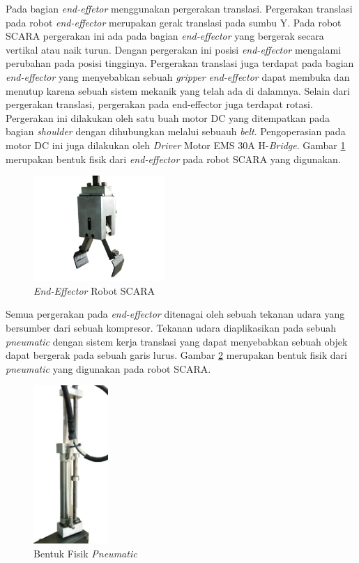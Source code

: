 Pada bagian \textit{end-effetor} menggunakan pergerakan translasi. Pergerakan translasi pada robot \textit{end-effector} merupakan gerak translasi pada sumbu Y. Pada robot SCARA pergerakan ini ada pada bagian \textit{end-effector} yang bergerak secara vertikal atau naik turun. Dengan pergerakan ini posisi \textit{end-effector} mengalami perubahan pada posisi tingginya. Pergerakan translasi juga terdapat pada bagian \textit{end-effector} yang menyebabkan sebuah \textit{gripper }\textit{ end-effector} dapat membuka dan menutup karena sebuah sistem mekanik yang telah ada di dalamnya. Selain dari pergerakan translasi, pergerakan pada end-effector juga terdapat rotasi. Pergerakan ini dilakukan oleh satu buah motor DC yang ditempatkan pada bagian \textit{shoulder} dengan dihubungkan melalui sebuauh \textit{belt}. Pengoperasian pada motor DC ini juga dilakukan oleh \textit{Driver} Motor EMS 30A H-\textit{Bridge}. Gambar \ref{pic.endeffectorfisik} merupakan bentuk fisik dari \textit{end-effector} pada robot SCARA yang digunakan. 
\begin{figure}[H]
	\centering
	\includegraphics[width=5cm]{gambar/capitsementara.jpg}
	\caption{\textit{End-Effector} Robot SCARA}
	\label{pic.endeffectorfisik}
	
\end{figure}
Semua pergerakan pada \textit{end-effector} ditenagai oleh sebuah tekanan udara yang bersumber dari sebuah kompresor. Tekanan udara diaplikasikan pada sebuah \textit{pneumatic} dengan sistem kerja translasi yang dapat menyebabkan sebuah objek dapat bergerak pada sebuah garis lurus. Gambar \ref{pic.pneumatic} merupakan bentuk fisik dari \textit{pneumatic} yang digunakan pada robot SCARA. 
\begin{figure}[H]
	\centering
	\includegraphics[height=6cm]{gambar/penuamticsementara.jpg}
	\caption{Bentuk Fisik \textit{Pneumatic}}
	\label{pic.pneumatic}
\end{figure}
